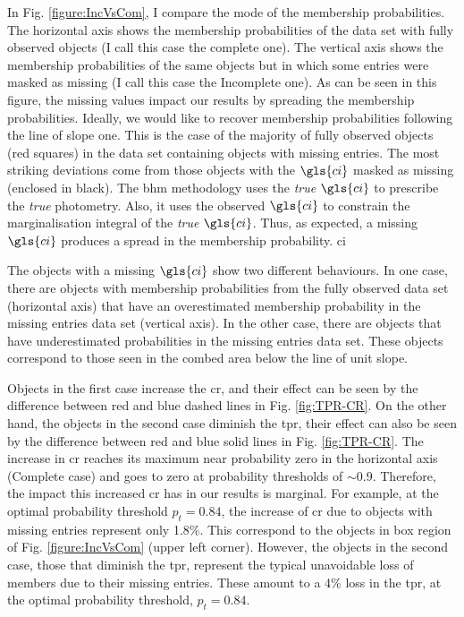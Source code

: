 In Fig. \ref{figure:IncVsCom}, I compare the mode of the membership probabilities. The horizontal axis shows the membership probabilities of the data set with fully observed objects (I call this case the complete one). The vertical axis shows the membership probabilities of the same objects but in which some entries were masked as missing (I call this case the Incomplete one). As can be seen in this figure, the missing values impact our results by spreading the membership probabilities. Ideally, we would like to recover membership probabilities following the line of slope one. This is the case of the majority of fully observed objects (red squares) in the data set containing objects with missing entries. The most striking deviations come from those objects with the $\gls{ci}$ masked as missing (enclosed in black). The \gls{bhm} methodology uses the \emph{true} $\gls{ci}$ to prescribe the \emph{true} photometry. Also, it uses the observed $\gls{ci}$ to constrain the marginalisation integral of the \emph{true} $\gls{ci}$. Thus, as expected, a missing $\gls{ci}$ produces a spread in the membership probability. \gls{ci}

The objects with a missing $\gls{ci}$ show two different behaviours. In one case, there are objects with membership probabilities from the fully observed data set (horizontal axis) that have an overestimated membership probability in the missing entries data set (vertical axis). In the other case, there are objects that have underestimated probabilities in the missing entries data set. These objects correspond to those seen in the combed area below the line of unit slope. 

Objects in the first case increase the \gls{cr}, and their effect can be seen by the difference between red and blue dashed lines in Fig. \ref{fig:TPR-CR}. On the other hand, the objects in the second case diminish the \gls{tpr}, their effect can also be seen by the difference between red and blue solid lines in Fig. \ref{fig:TPR-CR}. The increase in \gls{cr} reaches its maximum near probability zero in the horizontal axis (Complete case) and goes to zero at probability thresholds of $\sim 0.9$. Therefore, the impact this increased \gls{cr} has in our results is marginal. For example, at the optimal probability threshold $p_t=0.84$, the increase of \gls{cr} due to objects with missing entries represent only 1.8\%. This correspond to the objects in box region of Fig. \ref{figure:IncVsCom} (upper left corner). However, the objects in the second case, those that diminish the \gls{tpr}, represent the typical unavoidable loss of members due to their missing entries. These amount to a 4\% loss in the \gls{tpr}, at the optimal probability threshold, $p_t=0.84$.


